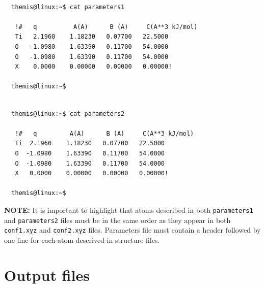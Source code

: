 \documentclass[10pt,a4paper]{report}
\begin{document}
\begin{center}
  \begin{minipage}{0.45\textwidth}
    \vskip0.25cm
    \begin{verbatim}

  themis@linux:~$ cat parameters1

   !#   q          A(A)      B (A)     C(A**3 kJ/mol)
   Ti   2.1960    1.18230   0.07700   22.5000
   O   -1.0980    1.63390   0.11700   54.0000
   O   -1.0980    1.63390   0.11700   54.0000
   X    0.0000    0.00000   0.00000   0.00000!

  themis@linux:~$

    \end{verbatim}
  \end{minipage}%
%
  \hskip0.75cm
%
  \begin{minipage}{0.45\textwidth}
    \vskip0.25cm
    \begin{verbatim}

  themis@linux:~$ cat parameters2

   !#   q         A(A)      B (A)     C(A**3 kJ/mol)
   Ti  2.1960    1.18230   0.07700   22.5000
   O  -1.0980    1.63390   0.11700   54.0000
   O  -1.0980    1.63390   0.11700   54.0000
   X   0.0000    0.00000   0.00000   0.00000!

  themis@linux:~$

    \end{verbatim}
  \end{minipage}%
\end{center}

  \textbf{NOTE:} It is important to highlight that atoms described in both \texttt{parameters1}
and \texttt{parameters2} files must be in the same order as they appear in both 
\texttt{conf1.xyz} and \texttt{conf2.xyz} files. Parameters file must contain a 
header followed by one line for each atom descrived in structure files.


\newpage

\chapter{Output files}
\end{document}
